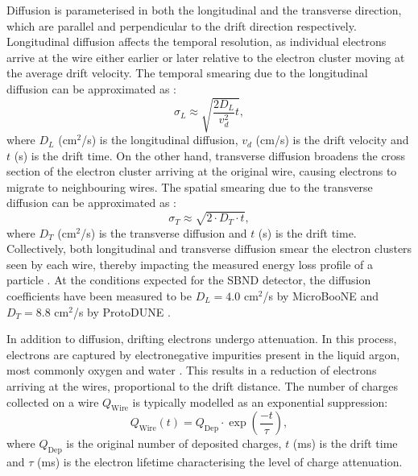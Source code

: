 Diffusion is parameterised in both the longitudinal and the transverse direction, which are parallel and perpendicular to the drift direction respectively.
Longitudinal diffusion affects the temporal resolution, as individual electrons arrive at the wire either earlier or later relative to the electron cluster moving at the average drift velocity.
The temporal smearing due to the longitudinal diffusion can be approximated as \cite{uboone_diff}:
\begin{equation}
        \sigma_{L} \approx \sqrt{\frac{2D_L}{v^{2}_{d}}t},
\end{equation}
where $D_L$ (cm$^2$/s) is the longitudinal diffusion, $v_{d}$ (cm/s) is the drift velocity and $t$ (s) is the drift time.
On the other hand, transverse diffusion broadens the cross section of the electron cluster arriving at the original wire, causing electrons to migrate to neighbouring wires.
The spatial smearing due to the transverse diffusion can be approximated as \cite{GrayDiffusion}:
\begin{equation}
        \sigma_T \approx \sqrt{2 \cdot D_T \cdot t},
\end{equation}
where $D_T$ (cm$^2$/s) is the transverse diffusion and $t$ (s) is the drift time.
Collectively, both longitudinal and transverse diffusion smear the electron clusters seen by each wire, thereby impacting the measured energy loss profile of a particle \cite{GrayDiffusion}.
At the conditions expected for the SBND detector, the diffusion coefficients have been measured to be $D_{L} = 4.0 $ cm$^{2}$/s by MicroBooNE \cite{uboone_diff} and $D_T = 8.8 $ cm$^{2}$/s by ProtoDUNE \cite{protodune}.

In addition to diffusion, drifting electrons undergo attenuation.  
In this process, electrons are captured by electronegative impurities present in the liquid argon, most commonly oxygen and water \cite{protodune}.
This results in a reduction of electrons arriving at the wires, proportional to the drift distance. 
The number of charges collected on a wire $Q_{\mathrm{Wire}}$ is typically modelled as an exponential suppression:
\begin{equation}
	Q_{\mathrm{Wire}} (t) = Q_{\mathrm{Dep}} \cdot \exp\left(\frac{-t}{\tau}\right),
\label{eq:etime}
\end{equation}
where $Q_{\mathrm{Dep}}$ is the original number of deposited charges, $t$ (ms) is the drift time and $\tau$ (ms) is the electron lifetime characterising the level of charge attenuation.

